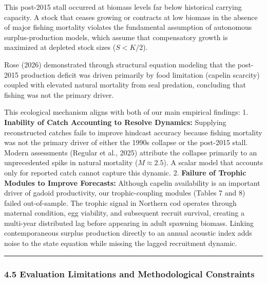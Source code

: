 \documentclass[11pt]{article}
\begin{document}
This post-2015 stall occurred at biomass levels far below historical
carrying capacity. A stock that ceases growing or contracts at low
biomass in the absence of major fishing mortality violates the
fundamental assumption of autonomous surplus-production models, which
assume that compensatory growth is maximized at depleted stock sizes
(\(S < K/2\)).

Rose (2026) demonstrated through structural equation modeling that the
post-2015 production deficit was driven primarily by food limitation
(capelin scarcity) coupled with elevated natural mortality from seal
predation, concluding that fishing was not the primary driver.

This ecological mechanism aligns with both of our main empirical
findings: 1. \textbf{Inability of Catch Accounting to Resolve Dynamics:}
Supplying reconstructed catches fails to improve hindcast accuracy
because fishing mortality was not the primary driver of either the 1990s
collapse or the post-2015 stall. Modern assessments (Regular et al.,
2025) attribute the collapse primarily to an unprecedented spike in
natural mortality (\(M \approx 2.5\)). A scalar model that accounts only
for reported catch cannot capture this dynamic. 2. \textbf{Failure of
Trophic Modules to Improve Forecasts:} Although capelin availability is
an important driver of gadoid productivity, our trophic-coupling modules
(Tables 7 and 8) failed out-of-sample. The trophic signal in Northern
cod operates through maternal condition, egg viability, and subsequent
recruit survival, creating a multi-year distributed lag before appearing
in adult spawning biomass. Linking contemporaneous surplus production
directly to an annual acoustic index adds noise to the state equation
while missing the lagged recruitment dynamic.

\begin{center}\rule{0.5\linewidth}{0.5pt}\end{center}

\subsubsection{4.5 Evaluation Limitations and Methodological
Constraints}\label{evaluation-limitations-and-methodological-constraints}
\end{document}
